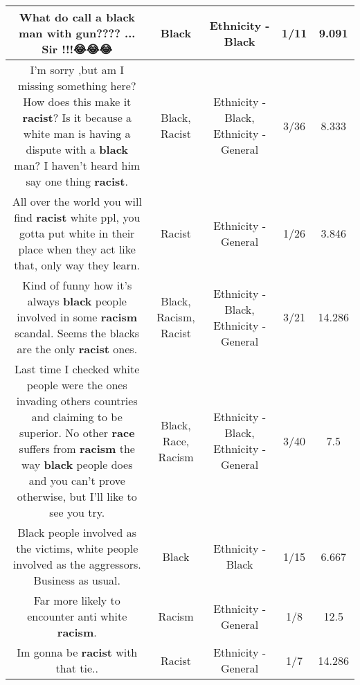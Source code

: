 \documentclass[11pt]{article}
\newlength\mylength
\begin{document}
\begin{center}
\begin{longtable}{|C{.65\mylength}|C{.30\mylength}|C{.12\mylength}|C{.12\mylength}|C{.12\mylength}|}
  \small What do call a \textbf{black} man with gun???? ... Sir !!!😂😂😂\normalsize   & Black & Ethnicity - Black & 1/11 & 9.091 \\  \hline
  \small I'm sorry ,but am I missing something here? How does this make it \textbf{racist}? Is it because a white man is having a dispute with a \textbf{black} man? I haven't heard him say one thing \textbf{racist}.\normalsize   & Black, Racist & Ethnicity - Black, Ethnicity - General & 3/36 & 8.333 \\  \hline
  \small All over the world you will find \textbf{racist} white ppl, you gotta put white in their place when they act like that, only way they learn.\normalsize   & Racist & Ethnicity - General & 1/26 & 3.846 \\  \hline
  \small Kind of funny how it's always \textbf{black}  people involved in some \textbf{racism} scandal. Seems the blacks are the only \textbf{racist} ones.\normalsize   & Black, Racism, Racist & Ethnicity - Black, Ethnicity - General & 3/21 & 14.286 \\  \hline
  \small Last time I checked white people were the ones invading others countries and claiming to be superior. No other \textbf{race} suffers from \textbf{racism} the way \textbf{black} people does and you can't prove otherwise, but I'll like to see you try.\normalsize   & Black, Race, Racism & Ethnicity - Black, Ethnicity - General & 3/40 & 7.5 \\  \hline
  \small Black people involved as the victims, white people involved as the aggressors. Business as usual.\normalsize   & Black & Ethnicity - Black & 1/15 & 6.667 \\  \hline
  \small Far more likely to encounter anti white \textbf{racism}.\normalsize   & Racism & Ethnicity - General & 1/8 & 12.5 \\  \hline
  \small Im gonna be \textbf{racist} with that tie..\normalsize   & Racist & Ethnicity - General & 1/7 & 14.286 \\  \hline

\end{longtable}
\end{center}
\end{document}
